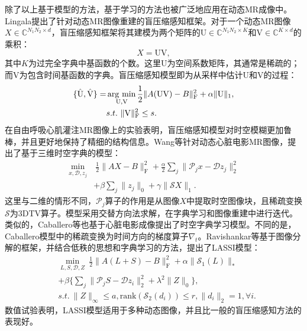 除了以上基于模型的方法，基于学习的方法也被广泛地应用在动态MR成像中。Lingala\cite{lingala2013blind}提出了针对动态MR图像重建的盲压缩感知框架。对于一个动态MR图像$X\in \mathbb{C}^{N_1N_2\times d}$，盲压缩感知框架将其建模为两个矩阵的$\mathrm{U}\in \mathbb{C}^{N_1N_2\times K}$和$\mathrm{V}\in \mathbb{C}^{K\times d}$的乘积：
$$X=\mathrm{UV},$$
其中$K$为过完全字典中基函数的个数。这里$\mathrm{U}$为空间系数矩阵，其通常是稀疏的；而$\mathrm{V}$为包含时间基函数的字典。盲压缩感知模型即为从采样中估计$\mathrm{U}$和$\mathrm{V}$的过程：
\begin{equation}
\begin{aligned}
	\{\hat{\mathrm{U}},\hat{\mathrm{V}}\}=&\argmin_{\mathrm{U},\mathrm{V}}\frac{1}{2}\|A(\mathrm{UV})-B\|_\mathrm{F}^2+\alpha\|\mathrm{U}\|_1,\\
	&s.t.\ \|\mathrm{V}\|_\mathrm{F}^2\leq s.
\end{aligned}
\end{equation}
在自由呼吸心肌灌注MR图像上的实验表明，盲压缩感知模型对时空模糊更加鲁棒，并且更好地保持了精细的结构信息。Wang\cite{wang2013compressed}等针对动态心脏电影MR图像，提出了基于三维时空字典的模型：
\begin{equation}
	\begin{aligned}
		\min_{x,\mathcal{D},z_j}&\ \frac{1}{2}\|AX-B\|_\mathrm{F}^2+\frac{\alpha}{2}\sum_j\|\mathcal{P}_jx-\mathcal{D}z_j\|_2^2\\
		&+\beta\sum_j\|z_j\|_0+\gamma\|\mathcal{S}X\|_1.
	\end{aligned}
\end{equation}
这里与二维的情形不同，$\mathcal{P}_j$算子的作用是从图像$X$中提取时空图像块，且稀疏变换$\mathcal{S}$为3DTV算子。模型采用交替方向法求解，在字典学习和图像重建中进行迭代。类似的，Caballero等\cite{caballero2014dictionary}也基于心脏电影成像提出了时空字典学习模型。不同的是，Caballero模型中的稀疏变换为时间方向的梯度算子$\nabla_t$。Ravishankar等\cite{ravishankar2015efficient}基于图像分解的框架，并结合低秩的思想和字典学习的方法，提出了LASSI模型：
\begin{equation}
	\begin{aligned}
		&\min_{L,S,\mathcal{D},Z}\ \frac{1}{2}\|A(L+S)-B\|_\mathrm{F}^2+\alpha\|\mathcal{S}_1(L)\|_*\\
		&+\beta\{\sum_j\|\mathcal{P}_jS-\mathcal{D}z_i\|^2_2+\lambda^2\|Z\|_0\},\\
		& s.t. \ \|Z\|_\infty\leq a, \mathrm{rank}(\mathcal{S}_2(d_i))\leq r, \|d_i\|_2=1,\forall i.
	\end{aligned}
\end{equation}
数值试验表明，LASSI模型适用于多种动态图像，并且比一般的盲压缩感知方法的表现好。

